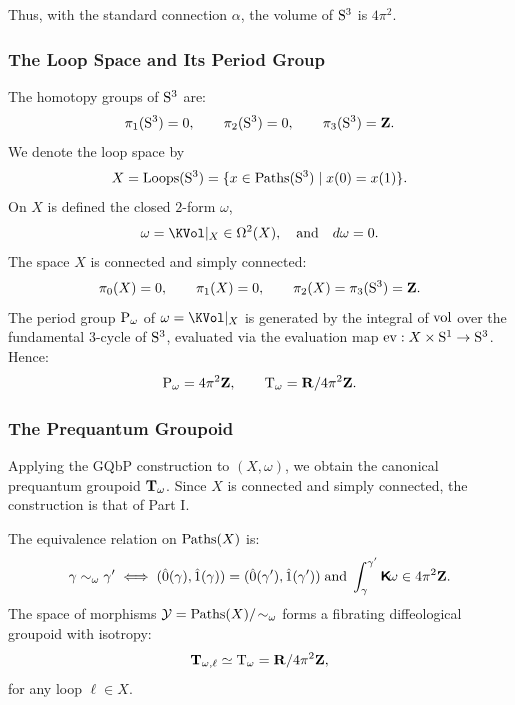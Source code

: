 \documentclass[11pt,reqno,letterpaper,twoside]{amsart}
\renewcommand{\TT}{\Groupoid{T}}
\renewcommand{\Komega}{\CHO\!\omega}
\begin{document}
  Thus,
  with the standard connection $\alpha$,
  the volume of $\mathrm{S}^3$ is $4\pi^2$.
  
  \subsubsection{The Loop Space and Its Period Group}
  
  The homotopy groups of $\mathrm{S}^3$ are:
  \[
    \pi_1(\mathrm{S}^3) = 0,\qquad
    \pi_2(\mathrm{S}^3) = 0,\qquad
    \pi_3(\mathrm{S}^3) = {\mathbf{Z}}.
    \]
  We denote the loop space by
  $$
    X = \operatorname{Loops}(\mathrm{S}^3) = \{ x \in \operatorname{Paths}(\mathrm{S}^3) \mid x(0) = x(1) \}.
    $$
  On $X$ is defined the closed $2$-form $\omega$,
  $$
    \omega = \KVol|_X \in \Omega^2(X),
    \qtext{and}
    d\omega = 0.
    $$
  The space $X$ is connected and simply connected:
  \[
    \pi_0(X) = 0,\qquad
    \pi_1(X) = 0,\qquad
    \pi_2(X) = \pi_3(\mathrm{S}^3) = {\mathbf{Z}}.
    \]
  The period group $\operatorname{P}_\omega$ of $\omega = \KVol|_X$ is generated by
  the integral of $\mathrm{vol}$ over the fundamental $3$-cycle of $\mathrm{S}^3$,
  evaluated via the evaluation map ${\operatorname{ev}}: X \times \mathrm{S}^1 \to \mathrm{S}^3$.
  Hence:
  \[
    \operatorname{P}_\omega = 4\pi^2 {\mathbf{Z}},
    \qquad
    \mathrm{T}_\omega = {\mathbf{R}} / 4\pi^2 {\mathbf{Z}}.
    \]
  
  \subsubsection{The Prequantum Groupoid}
  
  Applying the GQbP construction to $(X, \omega)$,
  we obtain the canonical prequantum groupoid $\TT_\omega$.
  Since $X$ is connected and simply connected,
  the construction is that of Part I.
  
  The equivalence relation on $\operatorname{Paths}(X)$ is:
  \[
    \gamma \sim_\omega \gamma'
    \iff
    \Ends(\gamma) = \Ends(\gamma')
    \;\text{and}\;
    \int_\gamma^{\gamma'} \Komega \in 4\pi^2 \ZZ.
    \]
  The space of morphisms $\mathcal{Y} = \operatorname{Paths}(X)/\!\sim_\omega$ forms a fibrating diffeological groupoid
  with isotropy:
  \[
    \TT_{\omega, \ell} \simeq \Tomega = \RR / 4\pi^2 \ZZ,
    \]
  for any loop $\ell \in X$.
  
\end{document}
